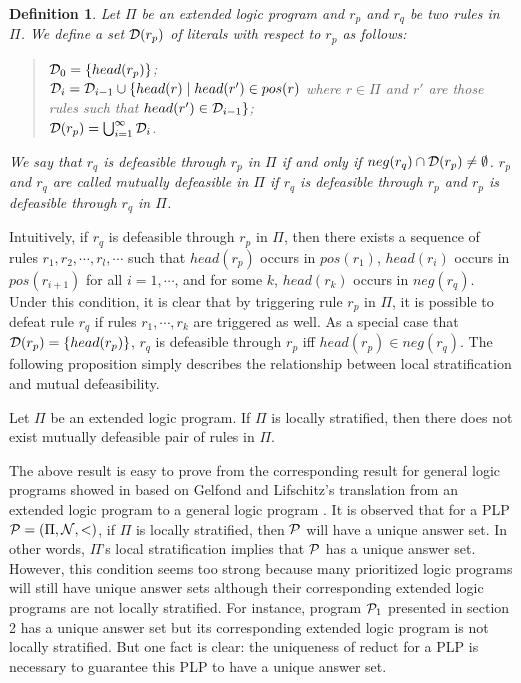 \documentclass{tlp}
\newtheorem{definition}{Definition} %
\begin{document}
\begin{definition}
Let $\Pi$ be an extended logic program
and $r_{p}$ and $r_{q}$ be two rules in $\Pi$.
We define a set ${\cal D}(r_{p})$ of literals with respect to
$r_{p}$ as follows:
\begin{quote}
${\cal D}_{0}=\{head(r_p)\}$;\\
\hspace*{.1in} ${\cal D}_{i}={\cal D}_{i-1}\cup \{head(r)\mid head(r')\in pos(r)$
where $r\in \Pi$ and 
$r'$ are those\\
\hspace*{1.4in}  rules such that $head(r')\in {\cal D}_{i-1}\}$;\\ 
\hspace*{.1in} ${\cal D}(r_{p})=\bigcup_{i=1}^{\infty} {\cal D}_{i}$.
\end{quote}
We say that
$r_{q}$ is {\em defeasible through} $r_{p}$ in $\Pi$ if and only if
$neg(r_{q})\cap {\cal D}(r_{p})\neq \emptyset$.
$r_{p}$ and $r_{q}$ are called {\em mutually defeasible} in $\Pi$ if
$r_{q}$ is defeasible through $r_{p}$ and
$r_{p}$ is defeasible through $r_{q}$ in $\Pi$.
\end{definition}

Intuitively, if $r_{q}$ is defeasible through $r_{p}$ in $\Pi$, then
there exists a sequence of rules
$r_{1}, r_{2}, \cdots, r_{l}, \cdots$ such that
$head(r_{p})$ occurs in $pos(r_{1})$, $head(r_{i})$ occurs
in $pos(r_{i+1})$ for all $i=1, \cdots$, and for some $k$, $head(r_{k})$ occurs in
$neg(r_{q})$. Under this condition, it is clear that by triggering rule
$r_{p}$ in $\Pi$, it is possible to defeat rule $r_{q}$ if
rules $r_{1}, \cdots, r_{k}$ are triggered as well.
As a special case that ${\cal D}(r_{p})=\{head(r_p)\}$, $r_{q}$ is defeasible
through $r_{p}$ iff $head(r_{p})\in neg(r_{q})$.
The following proposition simply describes the relationship between
local stratification and mutual defeasibility.

\begin{proposition}
Let $\Pi$ be an extended logic program.
If $\Pi$ is locally stratified, then there does not exist
mutually defeasible pair of rules in $\Pi$.
\end{proposition}

The above result is easy to prove from the corresponding result for general
logic programs showed in \cite{gl:stable} based on
Gelfond and Lifschitz's translation
from an extended logic program to a general logic program \cite{gl:logic}.
It is observed that for a PLP ${\cal P}=(\Pi,{\cal N},<)$, if
$\Pi$ is locally stratified, then ${\cal P}$ will have a unique answer set.
In other words, $\Pi$'s local stratification implies that ${\cal P}$
has a unique answer set.
However, this condition seems too strong because
many prioritized logic programs will still have unique answer sets although
their corresponding extended logic programs
are not locally stratified. For
instance, program ${\cal P}_{1}$ presented in section 2 has a unique
answer set but its corresponding
extended logic program is not locally stratified.
But one fact is clear: the uniqueness of reduct for a PLP is necessary
to guarantee this PLP to have a unique answer set.
\end{document}
